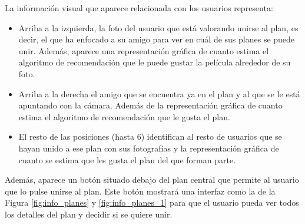 La información visual que aparece relacionada con los usuarios representa:
\begin{itemize}
    \item Arriba a la izquierda, la foto del usuario que está valorando unirse al plan, es decir, el que ha enfocado a su amigo para ver en cuál de sus planes se puede unir. Además, aparece una representación 
    gráfica de cuanto estima el algoritmo de recomendación que le puede gustar la película alrededor de su foto.
    \item Arriba a la derecha el amigo que se encuentra ya en el plan y al que se le está apuntando con la cámara. Además de la representación gráfica de cuanto estima el algoritmo de recomendación que le gusta el plan.
    \item El resto de las posiciones (hasta 6) identifican al resto de usuarios que se hayan unido a ese plan con sus fotografías y la representación gráfica de cuanto se estima que les gusta el plan del que forman parte.
\end{itemize}
Además, aparece un botón situado debajo del plan central que permite al usuario que lo pulse unirse al 
plan. Este botón mostrará una interfaz como la de la Figura \ref{fig:info_planes} y \ref{fig:info_planes_1} para que el usuario pueda ver todos 
los detalles del plan y decidir si se quiere unir.

